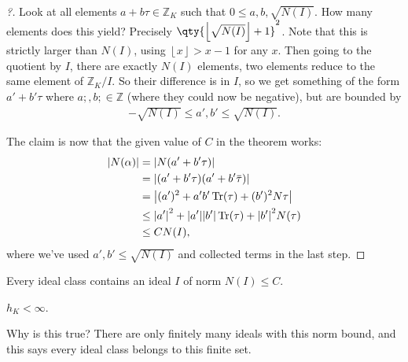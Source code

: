 \begin{proof}[?]

Look at all elements \(a + b \tau \in {\mathbb{Z}}_K\) such that
\(0 \leq a,b, \sqrt{ N(I) }\). How many elements does this yield?
Precisely \(\qty{ {\left\lfloor \sqrt{N(I)} \right\rfloor} +1 }^2\).
Note that this is strictly larger than \(N(I)\), using
\({\left\lfloor x \right\rfloor} > x-1\) for any \(x\). Then going to
the quotient by \(I\), there are exactly \(N(I)\) elements, two elements
reduce to the same element of \({\mathbb{Z}}_K/I\). So their difference
is in \(I\), so we get something of the form \(a' + b' \tau\) where
\(a;, b; \in {\mathbb{Z}}\) (where they could now be negative), but are
bounded by
\begin{align*}
- \sqrt{N(I)}
\leq a', b' \leq 
 \sqrt{N(I)} 
.\end{align*}

The claim is now that the given value of \(C\) in the theorem works:
\begin{align*}
{\left\lvert {N( \alpha)} \right\rvert}
&=
{\left\lvert {N( a' + b' \tau)} \right\rvert} \\
&=
{\left\lvert {(a' + b' \tau) (a' + b' \mkern 1.5mu\overline{\mkern-1.5mu\tau\mkern-1.5mu}\mkern 1.5mu)} \right\rvert} \\
&= {\left\lvert {(a')^2 + a'b' \operatorname{Tr}(\tau) + (b')^2 N \tau} \right\rvert} \\
&\leq 
{\left\lvert {a'} \right\rvert}^2 + {\left\lvert {a'} \right\rvert} {\left\lvert {b'} \right\rvert} \operatorname{Tr}(\tau) + {\left\lvert {b'} \right\rvert}^2 N(\tau) \\
&\leq C N(I)
,\end{align*}
where we've used \(a', b' \leq \sqrt{N(I)}\) and collected terms in the
last step.

\end{proof}

\begin{proposition}

Every ideal class contains an ideal \(I\) of norm \(N(I) \leq C\).

\end{proposition}

\begin{corollary}

\(h_K < \infty\).

\end{corollary}

\begin{remark}

Why is this true? There are only finitely many ideals with this norm
bound, and this says every ideal class belongs to this finite set.

\end{remark}

